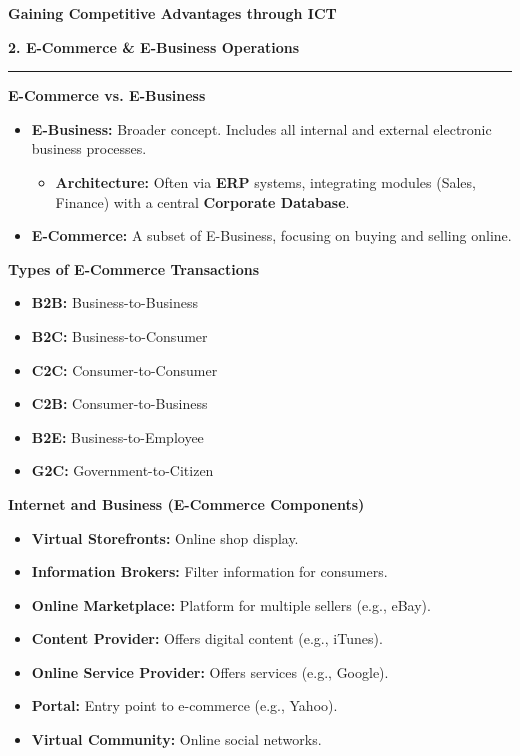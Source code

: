 \documentclass[a4paper, 8pt]{extarticle}
\newcommand{\sectionheading}[1]{\large\textbf{#1}\par\noindent\rule{\linewidth}{0.4pt}}
\newcommand{\subsectionheading}[1]{\normalsize\textbf{#1}}
\begin{document}
\begin{multicols}{2}
\subsectionheading{Gaining Competitive Advantages through ICT}

\columnbreak %


\sectionheading{2. E-Commerce \& E-Business Operations}
\vspace{0.5em}
\subsectionheading{E-Commerce vs. E-Business}
\begin{itemize}
    \item \textbf{E-Business:} Broader concept. Includes all internal and external electronic business processes.
    \begin{itemize}
        \item \textbf{Architecture:} Often via \textbf{ERP} systems, integrating modules (Sales, Finance) with a central \textbf{Corporate Database}.
    \end{itemize}
    \item \textbf{E-Commerce:} A subset of E-Business, focusing on buying and selling online.
\end{itemize}

\subsectionheading{Types of E-Commerce Transactions}
\begin{tcolorbox}
\begin{itemize}
    \item \textbf{B2B:} Business-to-Business
    \item \textbf{B2C:} Business-to-Consumer
    \item \textbf{C2C:} Consumer-to-Consumer
    \item \textbf{C2B:} Consumer-to-Business
    \item \textbf{B2E:} Business-to-Employee
    \item \textbf{G2C:} Government-to-Citizen
\end{itemize}
\end{tcolorbox}

\subsectionheading{Internet and Business (E-Commerce Components)}
\begin{itemize}
    \item \textbf{Virtual Storefronts:} Online shop display.
    \item \textbf{Information Brokers:} Filter information for consumers.
    \item \textbf{Online Marketplace:} Platform for multiple sellers (e.g., eBay).
    \item \textbf{Content Provider:} Offers digital content (e.g., iTunes).
    \item \textbf{Online Service Provider:} Offers services (e.g., Google).
    \item \textbf{Portal:} Entry point to e-commerce (e.g., Yahoo).
    \item \textbf{Virtual Community:} Online social networks.
\end{itemize}


\end{multicols}
\end{document}
